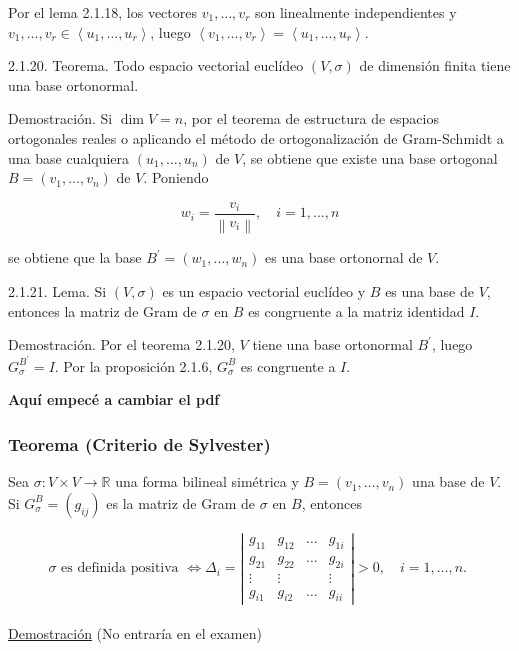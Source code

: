\documentclass[12pt, a4paper, ones, notitlepage, openany,titlepage]{article}
\begin{document}
Por el lema 2.1.18, los vectores $v_{1}, \ldots, v_{r}$ son linealmente independientes y $v_{1}, \ldots, v_{r} \in\left\langle u_{1}, \ldots, u_{r}\right\rangle$, luego $\left\langle v_{1}, \ldots, v_{r}\right\rangle=\left\langle u_{1}, \ldots, u_{r}\right\rangle$.

2.1.20. Teorema. Todo espacio vectorial euclídeo $(V, \sigma)$ de dimensión finita tiene una base ortonormal.

Demostración. Si $\operatorname{dim} V=n$, por el teorema de estructura de espacios ortogonales reales o aplicando el método de ortogonalización de Gram-Schmidt a una base cualquiera $\left(u_{1}, \ldots, u_{n}\right)$ de $V$, se obtiene que existe una base ortogonal $B=\left(v_{1}, \ldots, v_{n}\right)$ de $V$. Poniendo

$$
w_{i}=\frac{v_{i}}{\left\|v_{i}\right\|}, \quad i=1, \ldots, n
$$

se obtiene que la base $B^{\prime}=\left(w_{1}, \ldots, w_{n}\right)$ es una base ortonornal de $V$.

2.1.21. Lema. Si $(V, \sigma)$ es un espacio vectorial euclídeo y $B$ es una base de $V$, entonces la matriz de Gram de $\sigma$ en $B$ es congruente a la matriz identidad $I$.

Demostración. Por el teorema 2.1.20, $V$ tiene una base ortonormal $B^{\prime}$, luego $G_{\sigma}^{B^{\prime}}=I$. Por la proposición 2.1.6, $G_{\sigma}^{B}$ es congruente a $I$.

\begin{huge}
	\textbf{Aquí empecé a cambiar el pdf}
\end{huge}

\subsubsection{Teorema (Criterio de Sylvester)} Sea $\sigma: V \times V \rightarrow \mathbb{R}$ una forma bilineal simétrica y $B=\left(v_{1}, \ldots, v_{n}\right)$ una base de $V$. Si $G_{\sigma}^{B}=\left(g_{i j}\right)$ es la matriz de Gram de $\sigma$ en $B$, entonces

$$
\sigma \text { es definida positiva } \Longleftrightarrow \Delta_{i}=\left|\begin{array}{cccc}
	g_{11} & g_{12} & \ldots & g_{1 i} \\
	g_{21} & g_{22} & \ldots & g_{2 i} \\
	\vdots & \vdots & & \vdots \\
	g_{i 1} & g_{i 2} & \ldots & g_{i i}
\end{array}\right|>0, \quad i=1, \ldots, n \text {. }
$$\\
\underline{Demostración} (No entraría en el examen)
\end{document}
